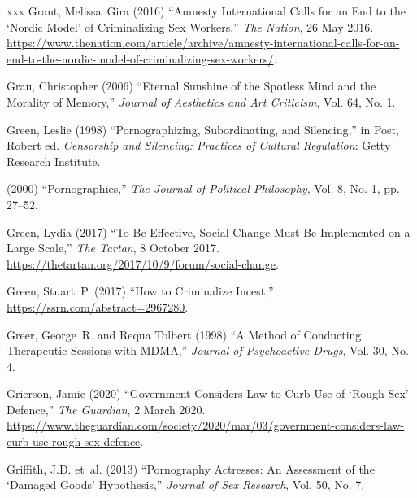 \documentclass[]{jlreq} \usepackage{mystyle}
\begin{document}
\begin{thebibliography}{xxx}
Grant, Melissa~Gira (2016) ``Amnesty International Calls for an End to the
  `Nordic Model' of Criminalizing Sex Workers,'' \emph{The Nation}, 26 May
  2016.
  \url{https://www.thenation.com/article/archive/amnesty-international-calls-for-an-end-to-the-nordic-model-of-criminalizing-sex-workers/}.

Grau, Christopher (2006) ``Eternal Sunshine of the Spotless Mind and the
  Morality of Memory,'' \textit{ Journal of Aesthetics and Art Criticism}, Vol.
  64, No. 1.

Green, Leslie (1998) ``Pornographizing, Subordinating, and Silencing,'' in
  Post, Robert ed.   \textit{ Censorship and Silencing: Practices of Cultural
  Regulation}: Getty Research Institute.

 \bysame{}  (2000) ``Pornographies,'' \textit{ The Journal of Political
  Philosophy}, Vol. 8, No. 1, pp. 27--52.

Green, Lydia (2017) ``To Be Effective, Social Change Must Be Implemented on a
  Large Scale,'' \emph{The Tartan}, 8 October 2017.
  \url{https://thetartan.org/2017/10/9/forum/social-change}.

Green, Stuart~P. (2017) ``How to Criminalize Incest,''
  \url{https://ssrn.com/abstract=2967280}.

Greer, George~R. and Requa Tolbert (1998) ``A Method of Conducting Therapeutic
  Sessions with MDMA,'' \textit{ Journal of Psychoactive Drugs}, Vol. 30, No.
  4.

Grierson, Jamie (2020) ``Government Considers Law to Curb Use of `Rough Sex'
  Defence,'' \emph{The Guardian}, 2 March 2020.
  \url{https://www.theguardian.com/society/2020/mar/03/government-considers-law-curb-use-rough-sex-defence}.

Griffith, J.D. et~al. (2013) ``Pornography Actresses: An Assessment of the
  `Damaged Goods' Hypothesis,'' \textit{ Journal of Sex Research}, Vol. 50, No.
  7.


\end{thebibliography}
\end{document}
